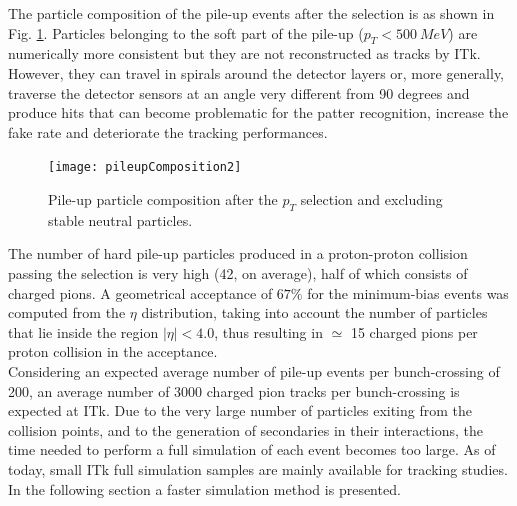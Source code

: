 \documentclass[a4paper,twoside,12pt]{book}
\begin{document}
The particle composition of the pile-up events after the selection is as shown in Fig.
\ref{fig:pileupComposition}. Particles belonging to the soft part of the pile-up ($p_{T} < 500\ MeV$) are numerically more consistent but 
they are not reconstructed as tracks by ITk. However, they can travel in spirals around the 
detector layers or, more generally, traverse the detector sensors at an angle very different
from 90 degrees and produce hits that can become problematic for the patter recognition, increase the fake rate and deteriorate the tracking
performances. \\

\begin{figure} [h]
	\texttt{[image: pileupComposition2]}
	\caption{Pile-up particle composition after the $p_{T}$ selection and excluding stable neutral particles.}
	\label{fig:pileupComposition}
\end{figure}

The number of hard pile-up particles produced in a proton-proton collision passing the selection is very high (42, on average), 
half of which consists of charged pions. A geometrical acceptance of $67\%$ for the minimum-bias events was computed from the $\eta$ distribution, taking into account the number of particles that 
lie inside the region $|\eta| < 4.0$, thus resulting in $\simeq$ 15 charged pions per proton collision in 
the acceptance.\\

Considering an expected average number of pile-up events per bunch-crossing of 200, an average number of 3000 charged pion tracks per bunch-crossing is expected at ITk.
Due to the very large number of particles exiting from the collision points, and to the generation of secondaries in their interactions, the time
needed to perform a full simulation of each event becomes too large.
As of today, small ITk full simulation samples are mainly available for tracking studies. In the following section a faster simulation method is presented.
\end{document}
